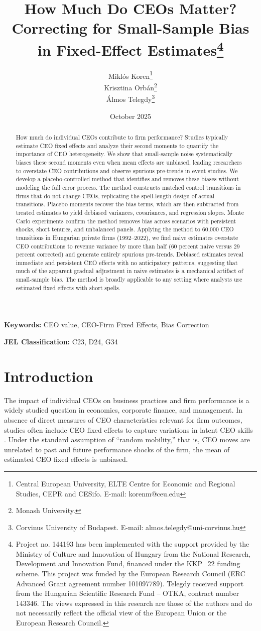 \documentclass[11pt,a4paper]{article}
\title{How Much Do CEOs Matter? Correcting for Small-Sample Bias in Fixed-Effect Estimates\thanks{Project no. 144193 has been implemented with the support provided by the Ministry of Culture and Innovation of Hungary from the National Research, Development and Innovation Fund, financed under the KKP\_22 funding scheme. This project was funded by the European Research Council (ERC Advanced Grant agreement number 101097789). Telegdy received support from the Hungarian Scientific Research Fund – OTKA, contract number 143346. The views expressed in this research are those of the authors and do not necessarily reflect the official view of the European Union or the European Research Council.}}
\author{Miklós Koren\thanks{Central European University, ELTE Centre for Economic and Regional Studies, CEPR and CESifo. E-mail: korenm@ceu.edu} \\
        Krisztina Orbán\thanks{Monash University.} \\
        Álmos Telegdy\thanks{Corvinus University of Budapest. E-mail: almos.telegdy@uni-corvinus.hu}}
\date{October 2025}
\begin{document}
\maketitle
\thispagestyle{empty}

\begin{abstract}
How much do individual CEOs contribute to firm performance? Studies typically estimate CEO fixed effects and analyze their second moments to quantify the importance of CEO heterogeneity. We show that small-sample noise systematically biases these second moments even when mean effects are unbiased, leading researchers to overstate CEO contributions and observe spurious pre-trends in event studies. We develop a placebo-controlled method that identifies and removes these biases without modeling the full error process. The method constructs matched control transitions in firms that do not change CEOs, replicating the spell-length design of actual transitions. Placebo moments recover the bias terms, which are then subtracted from treated estimates to yield debiased variances, covariances, and regression slopes. Monte Carlo experiments confirm the method removes bias across scenarios with persistent shocks, short tenures, and unbalanced panels. Applying the method to 60,000 CEO transitions in Hungarian private firms (1992--2022), we find naive estimates overstate CEO contributions to revenue variance by more than half (60 percent naive versus 29 percent corrected) and generate entirely spurious pre-trends. Debiased estimates reveal immediate and persistent CEO effects with no anticipatory patterns, suggesting that much of the apparent gradual adjustment in naive estimates is a mechanical artifact of small-sample bias. The method is broadly applicable to any setting where analysts use estimated fixed effects with short spells.
\end{abstract}

\textbf{Keywords:} CEO value, CEO-Firm Fixed Effects, Bias Correction

\textbf{JEL Classification:} C23, D24, G34

\clearpage
\setcounter{page}{1}

\section{Introduction}

The impact of individual CEOs on business practices and firm performance is a widely studied question in economics, corporate finance, and management. In absence of direct measures of CEO characteristics relevant for firm outcomes, studies often include CEO fixed effects to capture variations in latent CEO skills \citep{Bertrand2003-io, crossland2011differences, quigley2015has}. Under the standard assumption of ``random mobility,'' that is, CEO moves are unrelated to past and future performance shocks of the firm, the mean of estimated CEO fixed effects is unbiased. 
\end{document}
